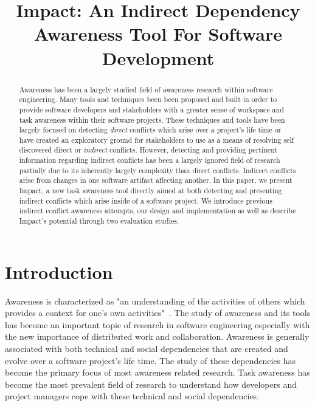 \documentclass[conference]{IEEEtran}
\begin{document}
\title{Impact: An Indirect Dependency Awareness Tool For Software Development}

\author{
\and
{}
}

\maketitle

\begin{abstract}
Awareness has been a largely studied field of awareness research within
software engineering. Many tools and techniques been been proposed and built
in order to provide software developers and stakeholders with a greater
sense of workspace and task awareness within their software projects. These
techniques and tools have been largely focused on detecting \textit{direct} 
conflicts which arise over a project's life time or have created 
an exploratory ground for stakeholders to use as a means of resolving self
discovered direct or \textit{indirect} conflicts. However, detecting 
and providing pertinent information regarding indirect conflicts has been
a largely ignored field of research partially due to its inherently largely
complexity than direct conflicts. Indirect conflicts arise from changes
in one software artifact affecting another. In this paper, we present
Impact, a new task awareness tool directly aimed at both detecting
and presenting indirect conflicts which arise inside of a software project.
We introduce previous indirect conflict awareness attempts, our design 
and implementation as well as describe Impact's potential through
two evaluation studies. 
\end{abstract}


\section{Introduction}
Awareness is characterized as "an understanding of the activities of others
which provides a context for one's own activities"~\cite{Dourish:1992:ACS}.
The study of awareness and its tools has become an important topic of
research in software engineering especially with the new importance of
distributed work and collaboration. Awareness is generally associated with
both technical and social dependencies that are created and evolve over
a software project's life time. The study of these dependencies has become
the primary focus of most awareness related research. Task awareness has
become the most prevalent field of research to understand how developers and
project managers cope with these technical and social dependencies.\\
\end{document}
